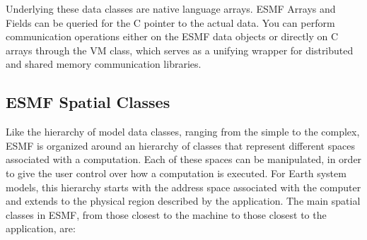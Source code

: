 Underlying these data classes are native language arrays.  ESMF Arrays 
and Fields can be queried for the C pointer to the actual data.  You can
perform communication operations either on the ESMF data objects or
directly on C arrays through the VM class, which serves 
as a unifying wrapper for distributed and shared memory communication 
libraries.

\subsection{ESMF Spatial Classes}
\label{sec:spatialclasses}

Like the hierarchy of model data classes, ranging from the 
simple to the complex, ESMF is organized around an hierarchy of 
classes that represent different spaces associated with a computation.
Each of these spaces can be manipulated, in order to give
the user control over how a computation is executed.  For Earth system
models, this hierarchy starts with the address space associated
with the computer and extends to the physical region described by
the application.   The main spatial classes in ESMF, from
those closest to the machine to those closest to the application, are:

